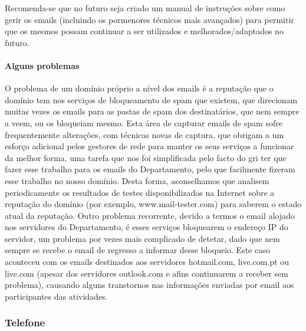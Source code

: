 Recomenda-se que no futuro seja criado um manual de instruções sobre como gerir os emails (incluindo os pormenores técnicos mais avançados) para permitir que os mesmos possam continuar a ser utilizados e melhorados/adaptados no futuro.

\paragraph{Alguns problemas}

O problema de um domínio próprio a nível dos emails é a reputação que o domínio tem nos serviços de bloqueamento de spam que existem, que direcionam muitas vezes os emails para as pastas de spam dos destinatários, que nem sempre a veem, ou os bloqueiam mesmo. Esta área de capturar emails de spam sofre frequentemente alterações, com técnicas novas de captura, que obrigam a um esforço adicional pelos gestores de rede para manter os seus serviços a funcionar da melhor forma, uma tarefa que nos foi simplificada pelo facto do \acrshort{gri} ter que fazer esse trabalho para os emails do Departamento, pelo que facilmente fizeram esse trabalho no nosso domínio. Desta forma, aconselhamos que analisem periodicamente os resultados de testes disponibilizados na Internet sobre a reputação do domínio (por exemplo, www.mail-tester.com) para saberem o estado atual da reputação. Outro problema recorrente, devido a termos o email alojado nos servidores do Departamento, é esses serviços bloquearem o endereço IP do servidor, um problema por vezes mais complicado de detetar, dado que nem sempre se recebe o email de regresso a informar desse bloqueio. Este caso aconteceu com os emails destinados aos servidores hotmail.com, live.com.pt ou live.com (apesar dos servidores outlook.com e afins continuarem a receber sem problema), causando alguns transtornos nas informações enviadas por email aos participantes das atividades.

\subsubsection{Telefone} \label{subsubsec:telefone}

